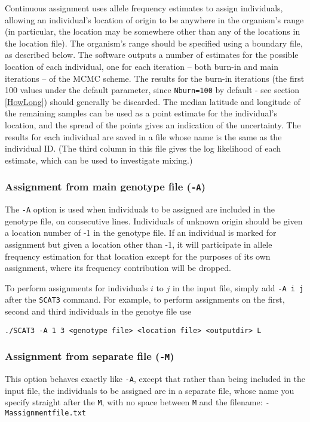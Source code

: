 \documentclass[10pt,titlepage,times,letterpaper]{article}
\def\SCAT{{\tt SCAT3} }
\begin{document}
Continuous assignment uses allele frequency estimates to assign
individuals, allowing an individual's location of origin to be
anywhere in the organism's range (in particular, the location may
be somewhere other than any of the locations in the location
file). The organism's range should be specified using a
boundary file, as described below. The software outputs a number of
estimates for the possible location of each individual, one for each
iteration -- both burn-in and main iterations -- of the MCMC
scheme. The results for the burn-in iterations (the first 100 values
under the default parameter, since {\tt Nburn=100} by default - see section
\ref{HowLong}) should generally be discarded. The median latitude and
longitude of the remaining samples can be used as a point estimate for
the individual's location, and the spread of the points gives an
indication of the uncertainty. The results for each individual are saved 
in a file whose name is the same as the individual ID. (The third column in
this file gives the log likelihood of each estimate, which can be
used to investigate mixing.)

\subsubsection{Assignment from main genotype file ({\tt -A})}

The {\tt -A} option is used when
individuals to be assigned are included in the genotype file, on
consecutive lines. Individuals of unknown origin should be given a
location number of -1 in the genotype file.  If an individual is marked for
assignment but given a location other than -1, it will participate in
allele frequency estimation for that location except for the purposes
of its own assignment, where its frequency contribution will be dropped.

To perform assignments for individuals $i$ to $j$ in the input file,
simply add {\tt -A i j} after the \SCAT command. For example, to
perform assignments on the first, second and third individuals in the
genotye file use

{\tt ./SCAT3 -A 1 3 <genotype file> <location file> <outputdir> L}

\subsubsection{Assignment from separate file ({\tt -M})} \label{assign2}

This option behaves exactly like {\tt -A}, except that rather than being
included in the input file, the individuals to be assigned are in a
separate file, whose name you specify straight after the {\tt M}, with
no space between {\tt M} and the filename:
 {\tt -Massignmentfile.txt} 
\end{document}
